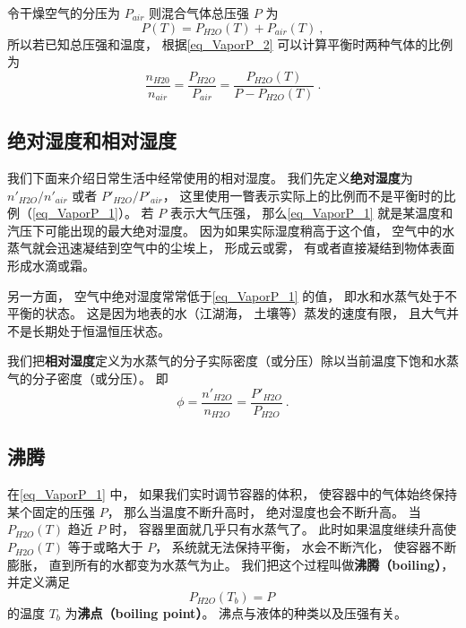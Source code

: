 令干燥空气的分压为 $P_{air}$ 则混合气体总压强 $P$ 为
\begin{equation}
P(T) = P_{H2O}(T) + P_{air}(T)~,
\end{equation}
所以若已知总压强和温度， 根据\autoref{eq_VaporP_2} 可以计算平衡时两种气体的比例为
\begin{equation}\label{eq_VaporP_1}
\frac{n_{H20}}{n_{air}} = \frac{P_{H2O}}{P_{air}} = \frac{P_{H2O}(T)}{P - P_{H2O}(T)}~.
\end{equation}

\subsection{绝对湿度和相对湿度}
我们下面来介绍日常生活中经常使用的相对湿度。 我们先定义\textbf{绝对湿度}为 $n'_{H2O}/n'_{air}$ 或者 $P'_{H2O}/P'_{air}$， 这里使用一瞥表示实际上的比例而不是平衡时的比例（\autoref{eq_VaporP_1}）。 若 $P$ 表示大气压强， 那么\autoref{eq_VaporP_1} 就是某温度和汽压下可能出现的最大绝对湿度。 因为如果实际湿度稍高于这个值， 空气中的水蒸气就会迅速凝结到空气中的尘埃上， 形成云或雾， 有或者直接凝结到物体表面形成水滴或霜。

另一方面， 空气中绝对湿度常常低于\autoref{eq_VaporP_1} 的值， 即水和水蒸气处于不平衡的状态。 这是因为地表的水（江湖海， 土壤等）蒸发的速度有限， 且大气并不是长期处于恒温恒压状态。

我们把\textbf{相对湿度}定义为水蒸气的分子实际密度（或分压）除以当前温度下饱和水蒸气的分子密度（或分压）。 即
\begin{equation}
\phi = \frac{n'_{H2O}}{n_{H2O}} = \frac{P'_{H2O}}{P_{H2O}}~.
\end{equation}

\subsection{沸腾}
在\autoref{eq_VaporP_1} 中， 如果我们实时调节容器的体积， 使容器中的气体始终保持某个固定的压强 $P$， 那么当温度不断升高时， 绝对湿度也会不断升高。 当 $P_{H2O}(T)$ 趋近 $P$ 时， 容器里面就几乎只有水蒸气了。 此时如果温度继续升高使 $P_{H2O}(T)$ 等于或略大于 $P$， 系统就无法保持平衡， 水会不断汽化， 使容器不断膨胀， 直到所有的水都变为水蒸气为止。 我们把这个过程叫做\textbf{沸腾（boiling）}， 并定义满足
\begin{equation}
P_{H2O}(T_b) = P~
\end{equation}
的温度 $T_b$ 为\textbf{沸点（boiling point）}。 沸点与液体的种类以及压强有关。
